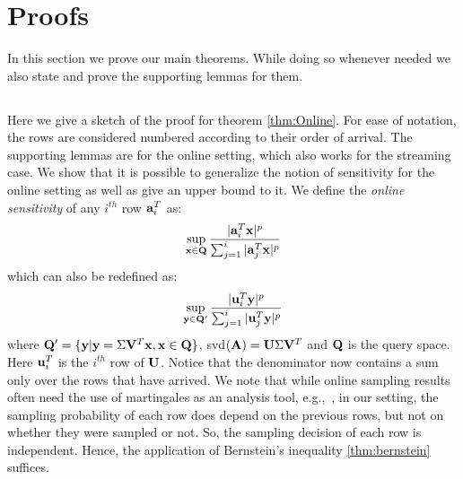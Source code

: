 \section{Proofs}{\label{sec:proofs}}
In this section we prove our main theorems. While doing so whenever needed we also state and prove the supporting lemmas for them. %
\subsection{\online}
Here we give a sketch of the proof for theorem \ref{thm:Online}. For ease of notation, the rows are considered numbered according to their order of arrival. The supporting lemmas are for the online setting, which also works for the streaming case.
We show that it is possible to generalize the notion of sensitivity for the online setting as well as give an upper bound to it. We define the {\em online sensitivity} of any $i^{th}$ row $\mathbf{a}_{i}^{T}$ as: 
\begin{equation*}
 \sup_{\mathbf{x}\in \mathbf{Q}}\frac{|\mathbf{a}_{i}^T\mathbf{x}|^{p}}{\sum_{j=1}^{i}|\mathbf{a}_{j}^T\mathbf{x}|^{p}} 
\end{equation*}
which can also be redefined as:
\begin{equation*}
 \sup_{\mathbf{y}\in \mathbf{Q}'}\frac{|\mathbf{u}_{i}^T\mathbf{y}|^{p}}{\sum_{j=1}^{i}|\mathbf{u}_{j}^T\mathbf{y}|^{p}}
\end{equation*}
where $\mathbf{Q}'= \{\mathbf{y}| \mathbf{y} = \Sigma \mathbf{V}^T \mathbf{x}, \mathbf{x}\in \mathbf{Q}\}$, svd$(\mathbf{A}) = \mathbf{U}\Sigma \mathbf{V}^{T}$ and $\mathbf{Q}$ is the query space. Here $\mathbf{u}_{i}^{T}$ is the $i^{th}$ row of $\mathbf{U}$. Notice that the denominator now contains a sum only over the rows that have arrived. 
We note that while online sampling results often need the use of martingales as an analysis tool, e.g.,~\cite{cohen2016online}, in our setting, the sampling probability of each row does depend on the previous rows, but not on whether they were sampled or not. So, the sampling decision
of each row is independent. Hence, the application of Bernstein's inequality \ref{thm:bernstein}
suffices.

